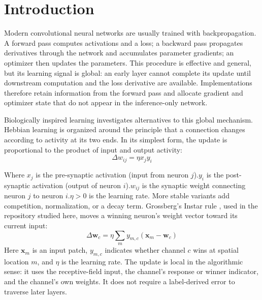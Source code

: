 \documentclass{article}
\begin{document}
    \vspace{1em}
    
    \section{Introduction}
    
    Modern convolutional neural networks are usually trained with backpropagation. A forward pass computes activations and a loss; a backward pass propagates derivatives through the network and accumulates parameter gradients; an optimizer then updates the parameters. This procedure is effective and general, but its learning signal is global: an early layer cannot complete its update until downstream computation and the loss derivative are available. Implementations therefore retain information from the forward pass and allocate gradient and optimizer state that do not appear in the inference-only network.
    
    Biologically inspired learning investigates alternatives to this global mechanism. Hebbian learning \cite{hebb1949organization} is organized around the principle that a connection changes according to activity at its two ends. In its simplest form, the update is proportional to the product of input and output activity:
    \begin{equation}
        \Delta w_{ij} = \eta x_j y_i
    \end{equation}

    Where $x_j$ is the pre-synaptic activation (input from neuron $j$).$y_i$ is the post-synaptic activation (output of neuron $i$).$w_{ij}$ is the synaptic weight connecting neuron $j$ to neuron $i$.$\eta > 0$ is the learning rate.
    More stable variants add competition, normalization, or a decay term. Grossberg's Instar rule \cite{grossberg1976adaptive}, used in the repository \cite{miconi2021hebbian} studied here, moves a winning neuron's weight vector toward its current input:
    \begin{equation}
    \Delta \mathbf{w}_c = \eta \sum_m y_{m,c} (\mathbf{x}_m - \mathbf{w}_c)
    \label{eq:instar_intro}
    \end{equation}
    Here $\mathbf{x}_m$ is an input patch, $y_{m,c}$ indicates whether channel $c$ wins at spatial location $m$, and $\eta$ is the learning rate. The update is local in the algorithmic sense: it uses the receptive-field input, the channel's response or winner indicator, and the channel's own weights. It does not require a label-derived error to traverse later layers.
    
\end{document}
